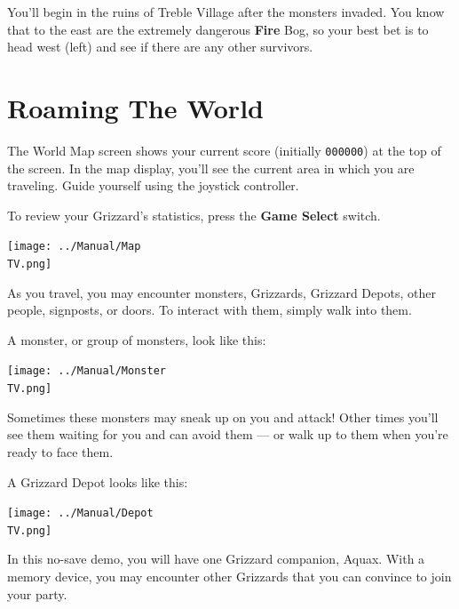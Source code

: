 \documentclass[10pt,twocolumn,openany,article]{memoir}
\newcommand\TV{NTSC}
\newcommand\TV{PAL}
\newcommand\TV{SECAM}
\begin{document}
\fi

You'll begin in the ruins of  Treble Village after the monsters invaded.
You know that to the east are  the extremely dangerous \textbf{Fire} Bog, so your
best  bet   is  to  head   west  (left)  and   see  if  there   are  any
other survivors.

\section{Roaming The World}

The   World   Map   screen   shows   your   current   score   (initially
\texttt{000000}) at  the top of the  screen. In the map  display, you'll
see the  current area in which  you are traveling. Guide  yourself using
the joystick controller.

To   review  your   Grizzard's   statistics,   press  the   \textbf{Game
  Select} switch.

\begin{center}
  \texttt{[image: ../Manual/Map\\TV.png]}
\end{center}

As  you   travel,  you  may   encounter  monsters,\ifdefined\NOSAVE\else
Grizzards,  \fi  Grizzard Depots,  other  people,  signposts, or  doors.
To interact with them, simply walk into them.

A  monster,  or group  of  monsters,  look  like this:

\begin{center}
  \texttt{[image: ../Manual/Monster\\TV.png]}
\end{center}

Sometimes these  monsters may sneak  up on  you and attack!  Other times
you'll see  them waiting for you  and can avoid  them --- or walk  up to
them when you're ready to face them.

A Grizzard Depot looks like this:

\begin{center}
  \texttt{[image: ../Manual/Depot\\TV.png]}
\end{center}

\ifdefined\NOSAVE

In  this no-save  demo, you  will  have one  Grizzard companion,  Aquax.
With a  memory device, you  may encounter  other Grizzards that  you can
convince to join your party.

\else
\end{document}
